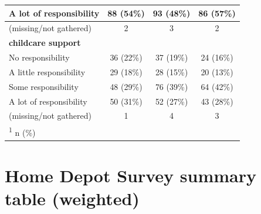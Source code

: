 \documentclass[
  11pt,
  oneside]{article}
\begin{document}
\begin{table}
\begin{tabular}[t]{l|c|c|c}
\hline
\hspace{1em}A lot of responsibility & 88 (54\%) & 93 (48\%) & 86 (57\%)\\
\hline
\hspace{1em}(missing/not gathered) & 2 & 3 & 2\\
\hline
\textbf{childcare support} &  &  & \\
\hline
\hspace{1em}No responsibility & 36 (22\%) & 37 (19\%) & 24 (16\%)\\
\hline
\hspace{1em}A little responsibility & 29 (18\%) & 28 (15\%) & 20 (13\%)\\
\hline
\hspace{1em}Some responsibility & 48 (29\%) & 76 (39\%) & 64 (42\%)\\
\hline
\hspace{1em}A lot of responsibility & 50 (31\%) & 52 (27\%) & 43 (28\%)\\
\hline
\hspace{1em}(missing/not gathered) & 1 & 4 & 3\\
\hline
\multicolumn{4}{l}{\rule{0pt}{1em}\textsuperscript{1} n (\%)}\\
\end{tabular}
\end{table}

\newpage

\section{Home Depot Survey summary table (weighted)}\label{app-survsum-w}
\end{document}

